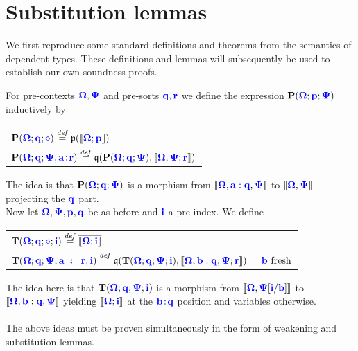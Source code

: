\documentclass[sigplan,10pt,review,anonymous]{acmart}
\newcommand{\blu}[1]{\textbf{\color{blue}{#1}}}
\newcommand{\blum}[1]{\mathbf{\color{blue}{#1}}}
\newcommand{\defeq}{\overset{\mathit{def}}{=}}
\newcommand{\sem}[1]{\llbracket #1 \rrbracket}
\newcommand{\mbf}[1]{\mathbf{#1}}
\begin{document}
\section{Substitution lemmas}

We first reproduce some standard definitions and theorems from the semantics of dependent types. These definitions and lemmas will subsequently be used to establish our own soundness proofs.
 
For pre-contexts $\blum{\Omega},\blum{\Psi}$ and pre-sorts $\blum{q},\blum{r}$ we define the expression $\mbf{P}(\blum{\Omega};\blum{p};\blum{\Psi})$ inductively by
\begin{center}

\begin{tabular}{l}
$\mbf{P}(\blum{\Omega}; \blum{q}; \blum{\diamond}) \defeq \frak p(\sem{\blum{\Omega; p}})$\\
$\mbf{P}(\blum{\Omega}; \blum{q}; \blum{\Psi,a \! : \! r}) \defeq \frak q (\mbf{P}(\blum{\Omega} ; \blum{q} ; \blum{\Psi}),\sem{\blum{\Omega},\blum{\Psi};\blum{r}})$
\end{tabular}
\end{center}

The idea is that $\mbf{P}(\blum{\Omega} ; \blum{q} ; \blum{\Psi})$ is a morphism from $\sem{\blum{\Omega}, \blum{a : q}, \blum{\Psi}}$ to $\sem{\blum{\Omega},\blum{\Psi}}$ projecting the $\blum{q}$ part. \\

Now let $\blum{\Omega},\blum{\Psi},\blum{p},\blum{q}$ be as before and $\blum{i}$ a pre-index. We define

\begin{center}
\begin{tabular}{l}
$\mbf{T}(\blum{\Omega};\blum{q};\blum{\blum{\diamond}};\blu{i}) \defeq \overline{\sem{\blum{\Omega;i}}}$\\
$\mbf{T}(\blum{\Omega};\blum{q};\blum{\Psi},\blu{a \! : \! r};\blum{i}) \defeq \frak q (\mbf{T}(\blum{\Omega};\blum{q};\blum{\Psi};\blum{i}), \sem{\blum{\Omega},\blum{b : q}, \blum{\Psi}; \blu{r}}) \hspace{3.5ex} \blum{b} \text{ fresh}$
\end{tabular}
\end{center}

The idea here is that $\mbf{T}(\blum{\Omega} ; \blum{q} ; \blum{\Psi} ; \blum{i})$ is a morphism from $\sem{\blum{\Omega},\blum{\Psi}[\blum{i}/\blum{b}]}$ to $\sem{\blum{\Omega}, \blum{b} : \blum{q}, \blum{\Psi}}$ yielding $\sem{\blum{\Omega} ; \blum{i}}$ at the $\blum{b \! : \! \blum{q}}$ position and variables otherwise.\\~\\
The above ideas must be proven simultaneously in the form of weakening and substitution lemmas.
\end{document}
